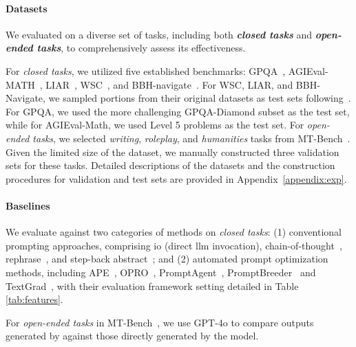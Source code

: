 \begin{table*}[t!]
{\begin{tabular}{l|ccccccc}
\hline

\hline

\hline
\end{tabular}
}
\end{table*}


\paragraph{Datasets}
We evaluated \ours on a diverse set of tasks, including both \textit{\textbf{closed tasks}} and \textbf{\textit{open-ended tasks}}, to comprehensively assess its effectiveness. 


For \textit{closed tasks}, we utilized five established benchmarks: GPQA~\cite{david2023gpqa}, AGIEval-MATH~\cite{wan2024agieval}, LIAR~\cite{william2017liar}, WSC~\cite{hector2012wsc}, and BBH-navigate~\cite{mirac2023bbh}. For WSC, LIAR, and BBH-Navigate, we sampled portions from their original datasets as test sets following~\citet{cilin2024erm}. 
For GPQA, we used the more challenging GPQA-Diamond subset as the test set, while for AGIEval-Math, we used Level 5 problems as the test set. For \textit{open-ended tasks}, we selected \textit{writing}, \textit{roleplay}, and \textit{humanities} tasks from MT-Bench~\cite{lianmin2023mtbench}. Given the limited size of the dataset, we manually constructed three validation sets for these tasks. Detailed descriptions of the datasets and the construction procedures for validation and test sets are provided in Appendix~\ref{appendix:exp}.


\paragraph{Baselines}

We evaluate \ours against two categories of methods on \textit{closed tasks}:
(1) conventional prompting approaches, comprising io (direct llm invocation), chain-of-thought~\cite{wei2022COT}, rephrase~\cite{deng2023rephrase}, and step-back abstract~\cite{hua2024step}; and 
(2) automated prompt optimization methods, including APE~\cite{yong2023ape}, OPRO~\cite{yang2023opro}, PromptAgent~\cite{xin2024pa}, PromptBreeder~\cite{chris2024pb} and TextGrad~\cite{mert2024textgrad}, with their evaluation framework setting detailed in Table \ref{tab:features}.

For \textit{open-ended tasks} in MT-Bench~\cite{lianmin2023mtbench}, we use GPT-4o to compare outputs generated by \ours against those directly generated by the model. 

